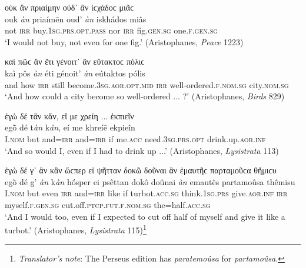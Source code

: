 \begin{exe}
\ex οὐκ ἂν πριαίμην οὐδ᾽ ἂν ἰϲχάδοϲ μιᾶϲ\\
\gll ouk \emph{àn} priaímēn oud' \emph{àn} iskhádos miâs\\
not \textsc{irr} buy.\textsc{1sg.prs.opt.pass} nor \textsc{irr} fig.\textsc{gen.sg} one.\textsc{f.gen.sg}\\
\trans `I would not buy, not even for one fig.' (Aristophanes, \textit{Peace} 1223)
\label{multian51}
\end{exe}

\begin{exe}
\ex καὶ πῶϲ ἂν ἔτι γένοιτ᾽ ἂν εὔτακτοϲ πόλιϲ\\
\gll kaì pôs \emph{àn} éti génoit' \emph{àn} eútaktos pólis\\
and how \textsc{irr} still become.\textsc{3sg.aor.opt.mid} \textsc{irr} well-ordered.\textsc{f.nom.sg} city.\textsc{nom.sg}\\
\trans `And how could a city become so well-ordered ... ?' (Aristophanes, \textit{Birds} 829)
\label{multian52}
\end{exe}

\begin{exe}
\ex ἐγὼ δέ τἂν κἄν, εἴ με χρείη ... ἐκπιεῖν\\
\gll egṑ dé t\emph{àn} k\emph{án}, eí me khreíē ekpieîn\\
I.\textsc{nom} but and=\textsc{irr} and=\textsc{irr} if me.\textsc{acc} need.\textsc{3sg.prs.opt} drink.up.\textsc{aor.inf}\\
\trans `And so would I, even if I had to drink up ...' (Aristophanes, \textit{Lysistrata} 113)
\label{multian53}
\end{exe}

\begin{exe}
\ex ἐγὼ δέ γ᾽ ἂν κἂν ὥϲπερ εἰ ψῆτταν δοκῶ δοῦναι ἂν ἐμαυτῆϲ παρταμοῦϲα θἤμιϲυ\\
\gll egṑ dé g' \emph{àn} k\emph{àn} hṓsper ei psêttan dokô doûnai \emph{àn} emautês partamoûsa thḗmisu\\
I.\textsc{nom} but even \textsc{irr} and=\textsc{irr} like if turbot.\textsc{acc.sg} think.\textsc{1sg.prs} give.\textsc{aor.inf} \textsc{irr} myself.\textsc{f.gen.sg} cut.off.\textsc{ptcp.fut.f.nom.sg} the=half.\textsc{acc.sg}\\
\trans `And I would too, even if I expected to cut off half of myself and give it like a turbot.' (Aristophanes, \textit{Lysistrata} 115)\footnote{\emph{Translator's note}: The Perseus edition has \textit{paratemoûsa} for \textit{partamoûsa}.}
\label{multian54}
\end{exe}

